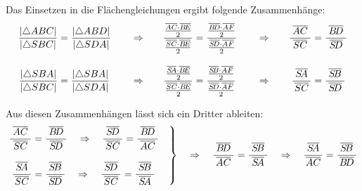 \documentclass
[
  draft    = true,
  fontsize = 11pt,
  parskip  = half-,
  BCOR     = 0pt,
  DIV      = 11
]
{scrartcl}
\begin{document}
\newcommand{\eqIL}{\frac{\left|\triangle ABC\right|}{\left|\triangle SBC\right|}&=\frac{\left|\triangle ABD\right|}{\left|\triangle SDA\right|}}
\newcommand{\eqIM}{\frac{\frac{\lineAC\cdot\lineBE}{2}}{\frac{\lineSC\cdot\lineBE}{2}}&=\frac{\frac{\lineBD\cdot\lineAF}{2}}{\frac{\lineSD\cdot\lineAF}{2}}}
\newcommand{\eqIR}{\frac{\;\lineAC\;}{\lineSC}&=\frac{\;\lineBD\;}{\lineSD}}
\newcommand{\eqIIL}{\frac{\left|\triangle SBA\right|}{\left|\triangle SBC\right|}&=\frac{\left|\triangle SBA\right|}{\left|\triangle SDA\right|}}
\newcommand{\eqIIM}{\frac{\frac{\lineSA\cdot\lineBE}{2}}{\frac{\lineSC\cdot\lineBE}{2}}&=\frac{\frac{\lineSB\cdot\lineAF}{2}}{\frac{\lineSD\cdot\lineAF}{2}}}
\newcommand{\eqIIR}{\frac{\;\lineSA\;}{\lineSC}&=\frac{\;\lineSB\;}{\lineSD}}
Das Einsetzen in die Flächengleichungen ergibt folgende Zusammenhänge:
\begin{alignat*}{5}
  \eqIL  & \quad&\Rightarrow\quad & \eqIM  & \quad&\Rightarrow\quad & \eqIR \\[2ex]
  \eqIIL & \quad&\Rightarrow\quad & \eqIIM & \quad&\Rightarrow\quad & \eqIIR
\end{alignat*}


Aus diesen Zusammenhängen lässt sich ein Dritter ableiten:
\begin{equation*}
  \left.
  \begin{split}
    \frac{\;\lineAC\;}{\lineSC}&=\frac{\;\lineBD\;}{\lineSD}
    \quad\Rightarrow\quad
    \frac{\;\lineSD\;}{\lineSC}=\frac{\;\lineBD\;}{\lineAC}
    \\[2ex]
    \frac{\;\lineSA\;}{\lineSC}&=\frac{\;\lineSB\;}{\lineSD}
    \quad\Rightarrow\quad
    \frac{\;\lineSD\;}{\lineSC}=\frac{\;\lineSB\;}{\lineSA}
  \end{split}\quad
  \right\}
  \quad\Rightarrow\quad
  \frac{\;\lineBD\;}{\lineAC}=\frac{\;\lineSB\;}{\lineSA}
  \quad\Rightarrow\quad
  \frac{\;\lineSA\;}{\lineAC}=\frac{\;\lineSB\;}{\lineBD}
\end{equation*}

\end{document}
